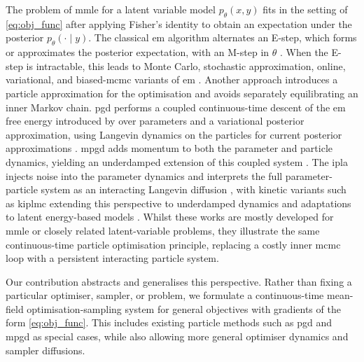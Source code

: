 The problem of \gls*{mmle} for a latent variable model $p_\theta(x,y)$ fits in the setting of \eqref{eq:obj_func} after applying Fisher's identity to obtain an expectation under the posterior $p_\theta(\cdot\mid y)$. The classical \gls*{em} algorithm alternates an E-step, which forms or approximates the posterior expectation, with an M-step in $\theta$ \citep{em_algorithm_dempster_laird_rubin}. When the E-step is intractable, this leads to Monte Carlo, stochastic approximation, online, variational, and biased-\gls*{mcmc} variants of \gls*{em} \citep{wei1990monte,delyon1999convergence,cappe2009online,gersende_em,pmlr-v238-gruffaz24a,JALA_NEURIPS2025_99d7d3fc}. Another approach 
introduces a particle approximation for the optimisation and avoids separately equilibrating an inner Markov chain. \gls*{pgd} performs a coupled continuous-time descent of the \gls*{em} free energy introduced by \cite{neal1998view} over parameters and a variational posterior approximation, using Langevin dynamics on the particles for current posterior approximations \citep{pmlr-v206-kuntz23a}. \gls*{mpgd} adds momentum to both the parameter and particle dynamics, yielding an underdamped extension of this coupled system \citep{lim2024momentumparticlemaximumlikelihood}. The \gls*{ipla} injects noise into the parameter dynamics and interprets the full parameter-particle system as an interacting Langevin diffusion \citep{akyildiz2025interacting}, with kinetic variants such as \gls*{kiplmc} extending this perspective to underdamped dynamics \citep{oliva2026kineticinteractingparticlelangevin} and adaptations to latent energy-based models \citep{marks2025learninglatentenergybasedmodels}. Whilst these works are mostly developed for \gls*{mmle} or closely related latent-variable problems, they illustrate the same continuous-time particle optimisation principle, replacing a costly inner \gls*{mcmc} loop with a persistent interacting particle system.

Our contribution abstracts and generalises this perspective. Rather than fixing a particular optimiser, sampler, or problem, we formulate a continuous-time mean-field optimisation-sampling system for general objectives with gradients of the form \eqref{eq:obj_func}. This includes existing particle methods such as \gls*{pgd} and \gls*{mpgd} as special cases, while also allowing more general optimiser dynamics and sampler diffusions.